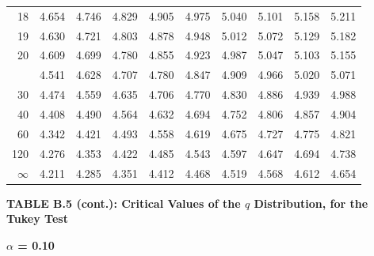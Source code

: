 \documentclass[10pt]{article}
\begin{document}
\begin{longtable}{@{}r!{\vrule width 0.8pt\hspace{0.55em}}rrrrrrrrr@{}}
18 & 4.654 & 4.746 & 4.829 & 4.905 & 4.975 & 5.040 & 5.101 & 5.158 & 5.211 \\
19 & 4.630 & 4.721 & 4.803 & 4.878 & 4.948 & 5.012 & 5.072 & 5.129 & 5.182 \\
20 & 4.609 & 4.699 & 4.780 & 4.855 & 4.923 & 4.987 & 5.047 & 5.103 & 5.155 \\
 & 4.541 & 4.628 & 4.707 & 4.780 & 4.847 & 4.909 & 4.966 & 5.020 & 5.071 \\
30 & 4.474 & 4.559 & 4.635 & 4.706 & 4.770 & 4.830 & 4.886 & 4.939 & 4.988 \\
40 & 4.408 & 4.490 & 4.564 & 4.632 & 4.694 & 4.752 & 4.806 & 4.857 & 4.904 \\
60 & 4.342 & 4.421 & 4.493 & 4.558 & 4.619 & 4.675 & 4.727 & 4.775 & 4.821 \\
120 & 4.276 & 4.353 & 4.422 & 4.485 & 4.543 & 4.597 & 4.647 & 4.694 & 4.738 \\
\addlinespace[0.30em]
$\infty$ & 4.211 & 4.285 & 4.351 & 4.412 & 4.468 & 4.519 & 4.568 & 4.612 & 4.654 \\
\end{longtable}
\newpage
\thispagestyle{empty}
\begin{center}
{\large\bfseries TABLE B.5 (cont.): Critical Values of the $q$ Distribution, for the Tukey Test\par}
\end{center}
{\large\bfseries $\alpha$ = 0.10\par}
\vspace{0.45em}
\small
\end{document}
